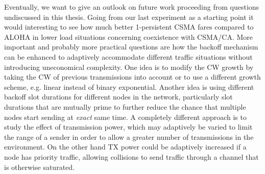 Eventually, we want to give an outlook on future work proceeding from questions undiscussed in this thesis. Going from our last experiment as a starting point it would interesting to see how much better 1-persistent CSMA fares compared to ALOHA in lower load situations concerning coexistence with CSMA/CA. More important and probably more practical questions are how the backoff mechanism can be enhanced to adaptively accommodate different traffic situations without introducing uneconomical complexity. One idea is to modify the CW growth by taking the CW of previous transmissions into account or to use a different growth scheme, e.g. linear instead of binary exponential. Another idea is using different backoff slot durations for different nodes in the network, particularly slot durations that are mutually prime to further reduce the chance that multiple nodes start sending at \emph{exact} same time. A completely different approach is to study the effect of transmission power, which may adaptively be varied to limit the range of a sender in order to allow a greater number of transmissions in the environment. On the other hand TX power could be adaptively increased if a node has priority traffic, allowing collisions to send traffic through a channel that is otherwise saturated. 
